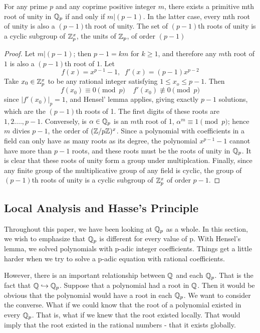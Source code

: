 \documentclass[a4paper]{article}
\begin{document}
\begin{proposition}
For any prime $p$ and any coprime positive integer $m$, there 
exists a primitive mth root of unity in $\mathbb Q_p$ if and only 
if $m|(p-1)$.  In the latter case, every mth root of unity is 
also a $(p-1)$th root of unity.  The set of $(p-1)$th roots of 
unity is a cyclic subgroup of $\mathbb Z_p^x$, the units of $\mathbb Z_p$, 
of order $(p-1)$
\end{proposition}
\begin{proof}
Let $m|(p-1)$; then $p-1=km$ for $k\geq 1$, and therefore any 
$m$th root of $1$ is also a $(p-1)$th root of $1$.  Let
\[
  f(x)=x^{p-1}-1,\;\;f'(x)=(p-1)x^{p-2}
\]
Take $x_0\in\mathbb Z_p^x$ to be any rational integer satisfying
$1\leq x_o\leq p-1$. Then
\[
  f(x_0)\equiv 0\pmod p\;\;\;\;f'(x_0)\not\equiv 0\pmod p
\]
since $|f'(x_0)|_p=1$, and Hensel' lemma applies, giving exactly 
$p-1$ solutions, which are the $(p-1)$th roots of 1.  The
first digits of these roots are $1,2.\dots,p-1$.  Conversely, is 
$\alpha\in\mathbb Q_p$ is an $m$th root of 1, $\alpha^m\equiv 1\pmod p$;
hence $m$ divies $p-1$, the order of $(\mathbb Z/p\mathbb Z)^x$.  Since a 
polynomial with coefficients in a field can only have as many roots
as its degree, the polynomial $x^{p-1}-1$ cannot have more than 
$p-1$ roots, and these roots must be the roots of unity in $\mathbb Q_p$.
It is clear that these roots of unity form a group under multiplcation.
Finally, since any finite group of the multiplicative group of any 
field is cyclic, the group of $(p-1)$th roots of unity is a cyclic
subgroup of $\mathbb Z_p^x$ of order $p-1$.
\end{proof}

\subsection{Local Analysis and Hasse's Principle}

Throughout this paper, we have been looking at $\mathbb Q_p$ as a 
whole.  In this section, we wish to emphasize that $\mathbb Q_p$ is
different for every value of p.  With Hensel's lemma, we solved
polynomials with p-adic integer coefficients.  Things get a little
harder when we try to solve a p-adic equation with rational
coefficients.

However, there is an important relationship between $\mathbb Q$ and each 
$\mathbb Q_p$.  That is the fact that $\mathbb Q\hookrightarrow\mathbb Q_p$.  Suppose 
that a polynomial had a root in $\mathbb Q$.  Then it would be 
obvious that the polynomial would have a root in each $\mathbb Q_p$.  We want 
to consider the converse.  What if we could know that the root of a 
polynomial existed in every $\mathbb Q_p$.  That is, what if we knew that the
root existed locally.  That would imply that the root existed in the
rational numbers - that it exists globally.
\end{document}
